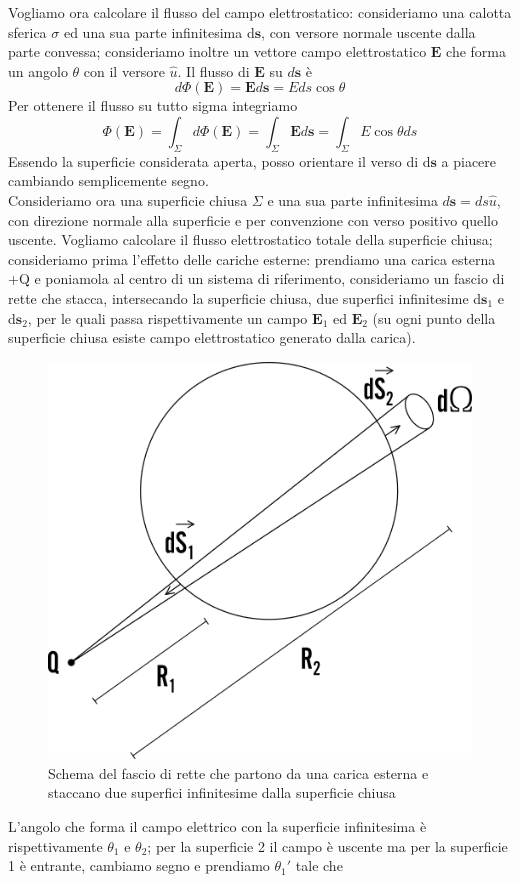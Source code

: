 \documentclass[
10pt, %
a4paper, %
oneside, %
headinclude,footinclude, %
BCOR5mm, %
]{scrartcl}
\begin{document}
Vogliamo ora calcolare il flusso del campo elettrostatico: consideriamo una calotta sferica \(\sigma\) ed una sua parte infinitesima d$\mathbf{s}$, con versore normale uscente dalla parte convessa; consideriamo inoltre un vettore campo elettrostatico $\mathbf{E}$ che forma un angolo \(\theta\) con il versore $\hat{u}$. Il flusso di $\mathbf{E}$ su \(d\mathbf{s}\) è 
\[d\Phi(\mathbf{E}) = \mathbf{E}d\mathbf{s} = Eds\cos\theta\]
Per ottenere il flusso su tutto sigma integriamo 
\[\Phi(\mathbf{E}) = \int_{\Sigma}d\Phi(\mathbf{E}) = \int_{\Sigma}\mathbf{E}d\mathbf{s} = \int_{\Sigma}E\cos\theta ds\]
Essendo la superficie considerata aperta, posso orientare il verso di d$\mathbf{s}$ a piacere cambiando semplicemente segno.\\
Consideriamo ora una superficie chiusa $\Sigma$ e una sua parte infinitesima $d\mathbf{s} = ds \hat{u}$, con direzione normale alla superficie e per convenzione con verso positivo quello uscente. Vogliamo calcolare il flusso elettrostatico totale della superficie chiusa; consideriamo prima l'effetto delle cariche esterne: prendiamo una carica esterna +Q e poniamola al centro di un sistema di riferimento, consideriamo un fascio di rette che stacca, intersecando la superficie chiusa, due superfici infinitesime d$\mathbf{s}_1$ e d$\mathbf{s}_2$, per le quali passa rispettivamente un campo $\mathbf{E}_1$ ed $\mathbf{E}_2$ (su ogni punto della superficie chiusa esiste campo elettrostatico generato dalla carica).  
\begin{figure}[h!]
	\centering
	\includegraphics[width=0.5\linewidth]{../images/thm_gauss_1}
	\caption{Schema del fascio di rette che partono da una carica esterna e staccano due superfici infinitesime dalla superficie chiusa}
	\label{fig:thmgauss1}
\end{figure}
\FloatBarrier
L'angolo che forma il campo elettrico con la superficie infinitesima è rispettivamente \(\theta_1\) e \(\theta_2\); per la superficie 2 il campo è uscente ma per la superficie 1 è entrante, cambiamo segno e prendiamo \(\theta_1'\) tale che
\end{document}
